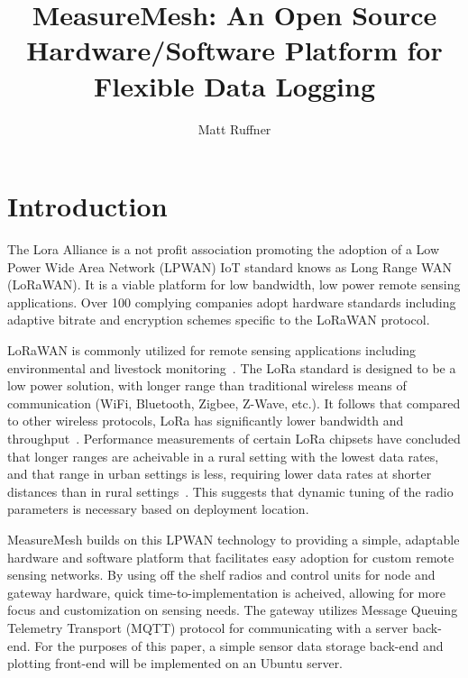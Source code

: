 \documentclass{IEEEtran}
\title{MeasureMesh: An Open Source Hardware/Software Platform for Flexible Data Logging}
\author{Matt Ruffner}
\date{}
\begin{document}
\maketitle




\section{Introduction}
 The Lora Alliance is a not profit association promoting the adoption of a Low Power Wide Area Network (LPWAN) IoT standard knows as Long Range WAN (LoRaWAN). It is a viable platform for low bandwidth, low power remote sensing applications. Over 100 complying companies adopt hardware standards including adaptive bitrate and encryption schemes specific to the LoRaWAN protocol.
 
LoRaWAN is commonly utilized for remote sensing applications including environmental and livestock monitoring~\cite{WuFan2018WAwI,IkhsanMukhammadGufron2018MLGf}. The LoRa standard is designed to be a low power solution, with longer range than traditional wireless means of communication (WiFi, Bluetooth, Zigbee, Z-Wave, etc.). It follows that compared to other wireless protocols, LoRa has significantly lower bandwidth and throughput~\cite{WuFan2018WAwI}. Performance measurements of certain LoRa chipsets have concluded that longer ranges are acheivable in a rural setting with the lowest data rates, and that range in urban settings is less, requiring lower data rates at shorter distances than in rural settings~\cite{RamonSanchez-Iborra2018PEoL}. This suggests that dynamic tuning of the radio parameters is necessary based on deployment location. 

MeasureMesh builds on this LPWAN technology to providing a simple, adaptable hardware and software platform that facilitates easy adoption for custom remote sensing networks. By using off the shelf radios and control units for node and gateway hardware, quick time-to-implementation is acheived, allowing for more focus and customization on sensing needs. The gateway utilizes Message Queuing Telemetry Transport (MQTT) protocol for communicating with a server back-end. For the purposes of this paper, a simple sensor data storage back-end and plotting front-end will be implemented on an Ubuntu server.
\end{document}
